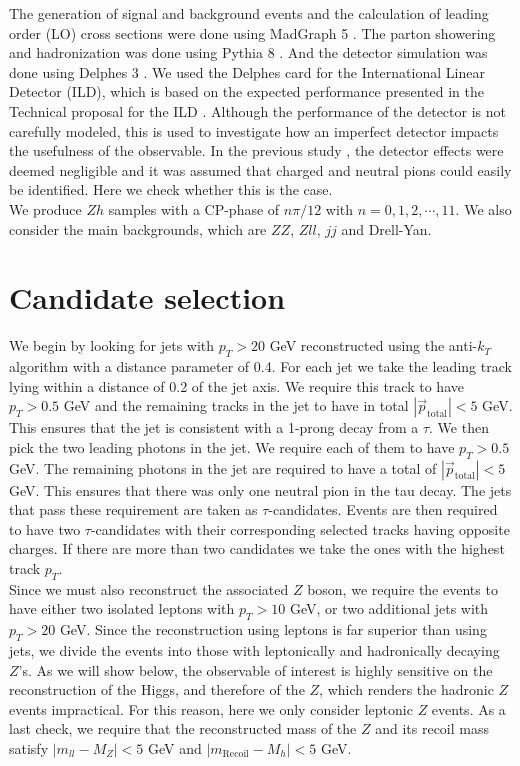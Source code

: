 \documentclass[preprintnumbers,nofootinbib,noshowpacs,eqsecnum,prd,superscriptaddress,letterpaper]{revtex4}
\begin{document}
The generation of signal and background events and the calculation of leading order (LO) cross sections were done using MadGraph 5 \cite{madgraph}. The parton showering and hadronization was done using Pythia 8 \cite{pythia}. And the detector simulation was done using Delphes 3 \cite{delphes}. We used the Delphes card for the International Linear Detector (ILD), which is based on the expected performance presented in the Technical proposal for the ILD \cite{ilc}. Although the performance of the detector is not carefully modeled, this is used to investigate how an imperfect detector impacts the usefulness of the observable. In the previous study \cite{harnik}, the detector effects were deemed negligible and it was assumed that charged and neutral pions could easily be identified. Here we check whether this is the case.\\

We produce $Zh$ samples with a CP-phase of $n\pi/12$ with $n=0,1,2,\cdots,11$. We also consider the main backgrounds, which are $ZZ$, $Zll$, $jj$ and Drell-Yan.

\section{Candidate selection}
\label{sec:selection}

We begin by looking for jets with $p_T>20$ GeV reconstructed using the anti-$k_T$ algorithm \cite{cacciari} with a distance parameter of 0.4. For each jet we take the leading track lying within a distance of 0.2 of the jet axis. We require this track to have $p_T>0.5$ GeV and the remaining tracks in the jet to have in total $|\vec{p}_\text{total}|<5$ GeV. This ensures that the jet is consistent with a 1-prong decay from a $\tau$. We then pick the two leading photons in the jet. We require each of them to have $p_T>0.5$ GeV. The remaining photons in the jet are required to have a total of $|\vec{p}_\text{total}|<5$ GeV. This ensures that there was only one neutral pion in the tau decay. The jets that pass these requirement are taken as $\tau$-candidates. Events are then required to have two $\tau$-candidates with their corresponding selected tracks having opposite charges. If there are more than two candidates we take the ones with the highest track $p_T$.\\

Since we must also reconstruct the associated $Z$ boson, we require the events to have either two isolated leptons with $p_T>10$ GeV, or two additional jets with $p_T>20$ GeV. Since the reconstruction using leptons is far superior than using jets, we divide the events into those with leptonically and hadronically decaying $Z$'s. As we will show below, the observable of interest is highly sensitive on the reconstruction of the Higgs, and therefore of the $Z$, which renders the hadronic $Z$ events impractical. For this reason, here we only consider leptonic $Z$ events. As a last check, we require that the reconstructed mass of the $Z$ and its recoil mass satisfy $|m_{ll}-M_Z|<5$ GeV and $|m_\text{Recoil}-M_h|<5$ GeV.\\
\end{document}

